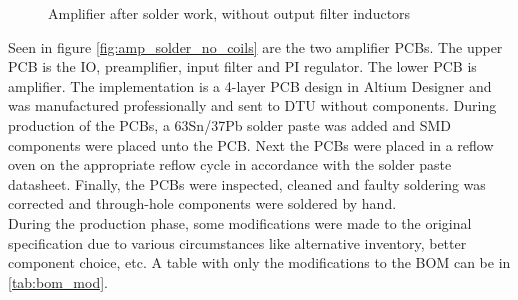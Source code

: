 \begin{figure}[htbp]
	\centering
	\caption{Amplifier after solder work, without output filter inductors}
	\label{fig:amp_solder_no_coils}
\end{figure}
Seen in figure \autoref{fig:amp_solder_no_coils} are the two amplifier PCBs. The upper PCB is the IO, preamplifier, input filter and PI regulator. The lower PCB is amplifier.
The implementation is a 4-layer PCB design in Altium Designer and was manufactured professionally and sent to DTU without components. During production of the PCBs, a 63Sn/37Pb solder paste was added and SMD components were placed unto the PCB. Next the PCBs were placed in a reflow oven on the appropriate reflow cycle in accordance with the solder paste datasheet. Finally, the PCBs were inspected, cleaned and faulty soldering was corrected and through-hole components were soldered by hand. \\
During the production phase, some modifications were made to the original specification due to various circumstances like alternative inventory, better component choice, etc. A table with only the modifications to the BOM can be in \autoref{tab:bom_mod}.
\begin{table}[htbp]
	\caption{Modifications to the Bill of Materials}
	\label{tab:bom_mod}
\end{table}
